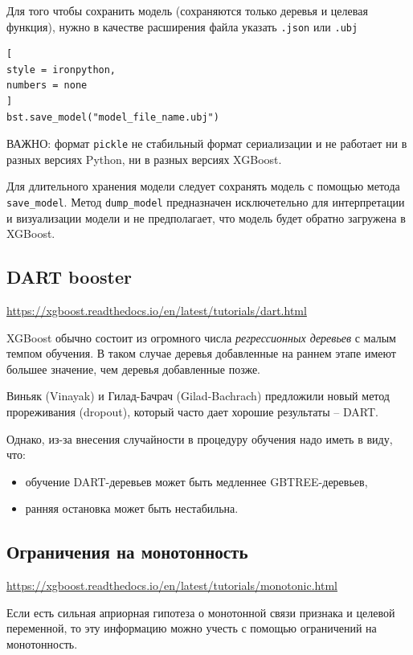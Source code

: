 \documentclass[%
	11pt,
	a4paper,
	utf8,
		]{article}
\begin{document}
Для того чтобы сохранить модель (сохраняются только деревья и целевая функция), нужно в качестве расширения файла указать \verb|.json| или \verb|.ubj|
\begin{lstlisting}[
style = ironpython,
numbers = none
]
bst.save_model("model_file_name.ubj")
\end{lstlisting}

ВАЖНО: формат \verb|pickle| не стабильный формат сериализации и не работает ни в разных версиях Python, ни в разных версиях XGBoost.

Для длительного хранения модели следует сохранять модель с помощью метода \verb|save_model|. Метод \verb|dump_model| предназначен исключетельно для интерпретации и визуализации модели и не предполагает, что модель будет обратно загружена в XGBoost.

\subsection{DART booster}

\url{https://xgboost.readthedocs.io/en/latest/tutorials/dart.html}

XGBoost обычно состоит из огромного числа \emph{регрессионных деревьев} с малым темпом обучения. В таком случае деревья добавленные на раннем этапе имеют большее значение, чем деревья добавленные позже.

 Виньяк (Vinayak) и Гилад-Бачрач (Gilad-Bachrach) \cite{dart:2015} предложили новый метод прореживания (dropout), который часто дает хорошие результаты -- DART.
 
 Однако, из-за внесения случайности в процедуру обучения надо иметь в виду, что:
 \begin{itemize}
 	\item  обучение DART-деревьев может быть медленнее GBTREE-деревьев,
 	
 	\item ранняя остановка может быть нестабильна.
 \end{itemize}

\subsection{Ограничения на монотонность}

\url{https://xgboost.readthedocs.io/en/latest/tutorials/monotonic.html}

Если есть сильная априорная гипотеза о монотонной связи признака и целевой переменной, то эту информацию можно учесть с помощью ограничений на монотонность.
\end{document}
